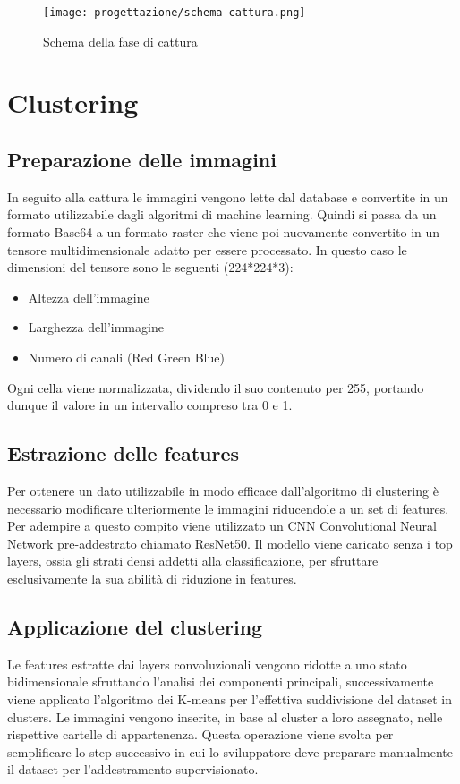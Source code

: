 \begin{figure}[!h] 
  \centering 
  \texttt{[image: progettazione/schema-cattura.png]} 
  \caption{Schema della fase di cattura}
  \label{fig:schema-cattura}
\end{figure}

\newpage

\section{Clustering}
\subsection{Preparazione delle immagini}
In seguito alla cattura le immagini vengono lette dal database e convertite in un formato utilizzabile dagli algoritmi di machine learning.
Quindi si passa da un formato Base64 a un formato raster che viene poi nuovamente convertito in un tensore multidimensionale adatto per essere processato.
In questo caso le dimensioni del tensore sono le seguenti (224*224*3):
\begin{itemize}
  \item Altezza dell'immagine
  \item Larghezza dell'immagine 
  \item Numero di canali (Red Green Blue)
\end{itemize} 
Ogni cella viene normalizzata, dividendo il suo contenuto per 255, portando dunque il valore in un intervallo compreso tra 0 e 1.

\subsection{Estrazione delle features}
Per ottenere un dato utilizzabile in modo efficace dall'algoritmo di clustering è necessario modificare ulteriormente le immagini riducendole a un set di features.
Per adempire a questo compito viene utilizzato un CNN Convolutional Neural Network pre-addestrato chiamato ResNet50.
Il modello viene caricato senza i top layers, ossia gli strati densi addetti alla classificazione, per sfruttare esclusivamente la sua abilità di riduzione in features.

\subsection{Applicazione del clustering}
Le features estratte dai layers convoluzionali vengono ridotte a uno stato bidimensionale sfruttando l'analisi dei componenti principali, successivamente viene applicato l'algoritmo dei K-means per l'effettiva suddivisione del dataset in clusters.
Le immagini vengono inserite, in base al cluster a loro assegnato, nelle rispettive cartelle di appartenenza.
Questa operazione viene svolta per semplificare lo step successivo in cui lo sviluppatore deve preparare manualmente il dataset per l'addestramento supervisionato.







